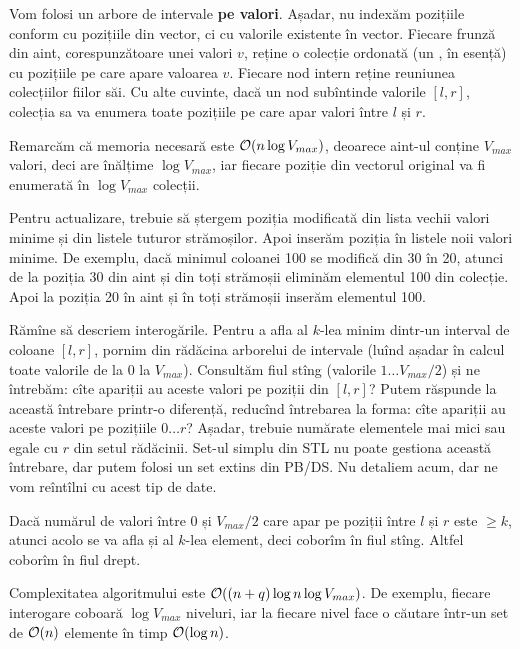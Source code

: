\documentclass[../main.tex]{subfiles}
\begin{document}
Vom folosi un arbore de intervale \textbf{pe valori}. Așadar, nu indexăm pozițiile conform cu pozițiile din vector, ci cu valorile existente în vector. Fiecare frunză din aint, corespunzătoare unei valori $v$, reține o colecție ordonată (un , în esență) cu pozițiile pe care apare valoarea $v$. Fiecare nod intern reține reuniunea colecțiilor fiilor săi. Cu alte cuvinte, dacă un nod subîntinde valorile $[l, r]$, colecția sa va enumera toate pozițiile pe care apar valori între $l$ și $r$.

Remarcăm că memoria necesară este $\mathcal{O}(n \log V_{max})$, deoarece aint-ul conține $V_{max}$ valori, deci are înălțime $\log V_{max}$, iar fiecare poziție din vectorul original va fi enumerată în $\log V_{max}$ colecții.

Pentru actualizare, trebuie să ștergem poziția modificată din lista vechii valori minime și din listele tuturor strămoșilor. Apoi inserăm poziția în listele noii valori minime. De exemplu, dacă minimul coloanei 100 se modifică din 30 în 20, atunci de la poziția 30 din aint și din toți strămoșii eliminăm elementul 100 din colecție. Apoi la poziția 20 în aint și în toți strămoșii inserăm elementul 100.

Rămîne să descriem interogările. Pentru a afla al $k$-lea minim dintr-un interval de coloane $[l, r]$, pornim din rădăcina arborelui de intervale (luînd așadar în calcul toate valorile de la 0 la $V_{max}$). Consultăm fiul stîng (valorile $1 \dots V_{max}/2$) și ne întrebăm: cîte apariții au aceste valori pe poziții din $[l, r]$? Putem răspunde la această întrebare printr-o diferență, reducînd întrebarea la forma: cîte apariții au aceste valori pe pozițiile $0 \dots r$? Așadar, trebuie numărate elementele mai mici sau egale cu $r$ din setul rădăcinii. Set-ul simplu din STL nu poate gestiona această întrebare, dar putem folosi un set extins din PB/DS. Nu detaliem acum, dar ne vom reîntîlni cu acest tip de date.

Dacă numărul de valori între 0 și $V_{max}/2$ care apar pe poziții între $l$ și $r$ este $\geq k$, atunci acolo se va afla și al $k$-lea element, deci coborîm în fiul stîng. Altfel coborîm în fiul drept.

Complexitatea algoritmului este $\mathcal{O}((n + q) \log n \log V_{max})$. De exemplu, fiecare interogare coboară $\log V_{max}$ niveluri, iar la fiecare nivel face o căutare într-un set de $\mathcal{O}(n)$ elemente în timp $\mathcal{O}(\log n)$.
\end{document}
